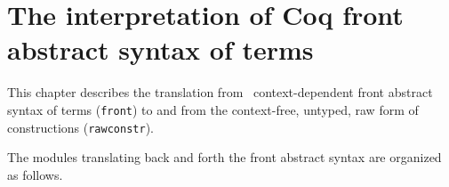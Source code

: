 
\newpage
\section*{The interpretation of Coq front abstract syntax of terms}

\ocwsection \label{interp}
This chapter describes the translation from \Coq\ context-dependent
front abstract syntax of terms (\verb=front=) to and from the
context-free, untyped, raw form of constructions (\verb=rawconstr=).

The modules translating back and forth the front abstract syntax are
organized as follows.

\bigskip
\begin{center}\end{center}
